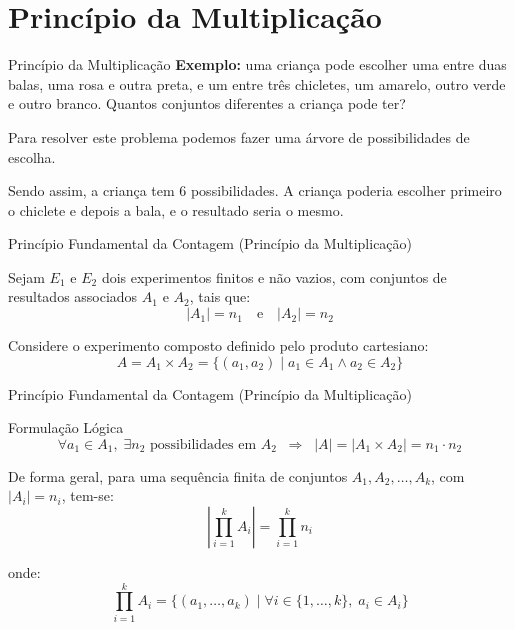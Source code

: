 \documentclass[9pt]{beamer}
\begin{document}
\section{Princípio da Multiplicação}
\begin{frame}{Princípio da Multiplicação}
\textbf{Exemplo:} uma criança pode escolher uma entre duas balas, uma rosa e outra preta, e um entre três chicletes, um amarelo, outro verde e outro branco. Quantos conjuntos diferentes a criança pode ter?

Para resolver este problema podemos fazer uma árvore de possibilidades de escolha.

\begin{center}
\end{center}

Sendo assim, a criança tem 6 possibilidades. A criança poderia escolher primeiro o chiclete e depois a bala, e o resultado seria o mesmo.
\end{frame}
\begin{frame}{Princípio Fundamental da Contagem (Princípio da Multiplicação)}

Sejam $E_1$ e $E_2$ dois experimentos finitos e não vazios, com conjuntos de resultados associados $A_1$ e $A_2$, tais que:
\[
|A_1| = n_1 \quad \text{e} \quad |A_2| = n_2
\]

\vspace{0.3cm}

Considere o experimento composto definido pelo produto cartesiano:
\[
A = A_1 \times A_2 = \{(a_1, a_2) \mid a_1 \in A_1 \land a_2 \in A_2\}
\]

\vspace{0.4cm}
\end{frame}
\begin{frame}{Princípio Fundamental da Contagem (Princípio da Multiplicação)}

\begin{block}{Formulação Lógica}
\[
\forall a_1 \in A_1, \; \exists n_2 \text{ possibilidades em } A_2
\;\;\Rightarrow\;\;
|A| = |A_1 \times A_2| = n_1 \cdot n_2
\]
\end{block}

\vspace{0.4cm}

De forma geral, para uma sequência finita de conjuntos $A_1, A_2, \dots, A_k$, com $|A_i| = n_i$, tem-se:
\[
\left| \prod_{i=1}^{k} A_i \right| = \prod_{i=1}^{k} n_i
\]

\vspace{0.2cm}

onde:
\[
\prod_{i=1}^{k} A_i = \{(a_1, \dots, a_k) \mid \forall i \in \{1,\dots,k\}, \; a_i \in A_i\}
\]

\end{frame}
\end{document}
